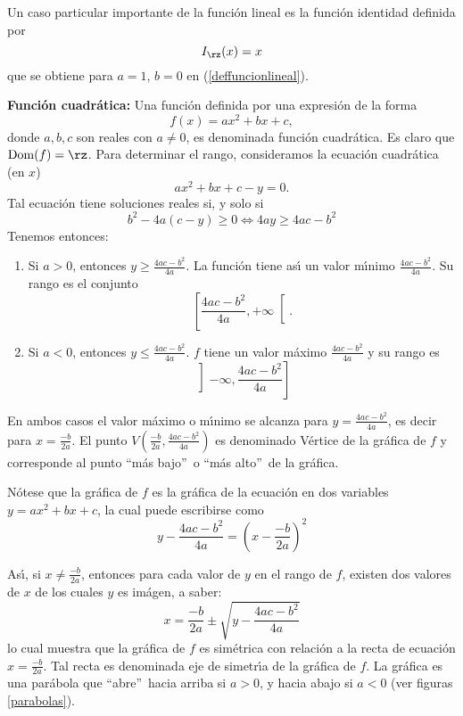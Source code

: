 Un caso particular importante de la funci\'{o}n lineal es la funci\'{o}n
identidad definida por
\begin{equation}
I_{\rz}(x)=x \label{funcionidentidad}%
\end{equation}
que se obtiene para $a=1$, $b=0$ en (\ref{deffuncionlineal}).

\begin{example}{\bf Funci\'{o}n cuadr\'{a}tica:}
%
Una funci\'{o}n definida por una expresi\'{o}n de la forma
\[
f(x)=ax^{2}+bx+c,
\]
donde $a,b,c$ son reales con $a\neq0$, es denominada funci\'{o}n
cuadr\'{a}tica. Es claro que $\operatorname*{Dom}(f)=\rz$. Para determinar el
rango, consideramos la ecuaci\'{o}n cuadr\'{a}tica (en $x$)%
\[
ax^{2}+bx+c-y=0.
\]
Tal ecuaci\'{o}n tiene soluciones reales si, y solo si
\[
b^{2}-4a(c-y)\geq0\Longleftrightarrow4ay\geq4ac-b^{2}%
\]
Tenemos entonces:

\begin{enumerate}
\item Si $a>0$, entonces $y\geq\frac{4ac-b^{2}}{4a}$. La funci\'{o}n tiene
as\'{\i} un valor m\'{\i}nimo $\frac{4ac-b^{2}}{4a}$. Su rango es el conjunto
\[
\left[  \left.  \frac{4ac-b^{2}}{4a},+\infty\right.  \right[  .
\]


\item Si $a<0$, entonces $y\leq\frac{4ac-b^{2}}{4a}$. $f$ tiene un valor
m\'{a}ximo $\frac{4ac-b^{2}}{4a}$ y su rango es%
\[
\left]  -\infty,\left.  \frac{4ac-b^{2}}{4a}\right.  \right]
\]

\end{enumerate}

En ambos casos el valor m\'{a}ximo o m\'{\i}nimo se alcanza para
$y=\frac{4ac-b^{2}}{4a}$, es decir para $x=\frac{-b}{2a}$. El punto $V\left(
\frac{-b}{2a},\frac{4ac-b^{2}}{4a}\right)  $ es denominado V\'{e}rtice de la
gr\'{a}fica de $f$ y corresponde al punto \textquotedblleft m\'{a}s
bajo\textquotedblright\ o \textquotedblleft m\'{a}s alto\textquotedblright\ de
la gr\'{a}fica.

N\'{o}tese que la gr\'{a}fica de $f$ es la gr\'{a}fica de la ecuaci\'{o}n en
dos variables $y=ax^{2}+bx+c$, la cual puede escribirse como
\begin{equation}
y-\frac{4ac-b^{2}}{4a}=\left(  x-\frac{-b}{2a}\right)  ^{2}%
\end{equation}

\end{example}

As\'{\i}, si $x\neq\frac{-b}{2a}$, entonces para cada valor de $y$ en el rango
de $f$, existen dos valores de $x$ de los cuales $y$ es im\'{a}gen, a saber:
\[
x=\frac{-b}{2a}\pm\sqrt{y-\frac{4ac-b^{2}}{4a}}%
\]
lo cual muestra que la gr\'{a}fica de $f$ es sim\'{e}trica con relaci\'{o}n a
la recta de ecuaci\'{o}n $x=\frac{-b}{2a}$. Tal recta es denominada eje de
simetr\'{\i}a de la gr\'{a}fica de $f$. La gr\'{a}fica es una par\'{a}bola%
que \textquotedblleft abre\textquotedblright\ hacia arriba si $a>0$, y hacia
abajo si $a<0$ (ver figuras \ref{parabolas}).%



